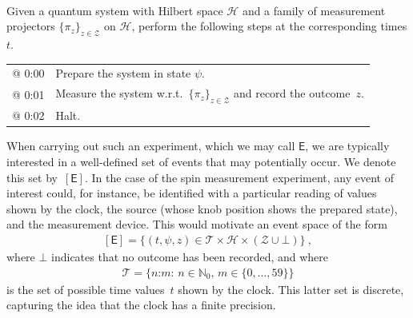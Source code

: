 \documentclass{article}
\theoremstyle{plain}
\theoremstyle{definition}
\newcommand*{\cH}{\mathcal{H}}
\newcommand*{\cT}{\mathcal{T}}
\newcommand*{\cZ}{\mathcal{Z}}
\newcommand*{\Exp}{\mathsf{E}}
\newcommand*{\BME}{\mathbf{BME}}
\newcommand*{\ExpBegin}[1]{
\vspace{0.2ex}
\begin{center}
\begin{minipage}{\linewidth}
\begin{framed}
\vspace{-0.6ex}
{\centering {\bf #1} \\ }
\vspace{1.1ex}
\nobreak}
\newcommand*{\ExpEnd}{
\vspace{-0.8ex}
\end{framed}
\end{minipage}
\end{center}
}
\begin{document}
\ExpBegin{Basic Measurement Experiment ($\BME$) }
  \noindent Given a quantum system with Hilbert space $\cH$ and a family of measurement projectors $\{\pi_z\}_{z \in \cZ}$ on $\cH$, perform the following steps at the corresponding times $t$.\footnotemark
 \vspace{1.4ex}

 \hspace{-0.6em}
\begin{tabular}{p{2.9em} p{}}
  @ 0:00 & Prepare the system in state $\psi$. \\
  @ 0:01 & Measure the system w.r.t.\  $\{\pi_z\}_{z \in \cZ}$ and record the outcome~$z$. \\
  @ 0:02 & Halt. 
\end{tabular}
\ExpEnd



When carrying out such an experiment, which we may call $\Exp$, we are typically interested in a well-defined set of events that may potentially occur. We denote this set by~$[\Exp]$. In the case of the spin measurement experiment, any  event of interest could, for instance, be identified with a particular reading of values shown by the clock, the source (whose knob position shows the prepared state), and the measurement device. This would motivate an event space of the form
\begin{align} \label{eq_BMEevents}
  [\Exp] = \bigl\{ (t, \psi, z) \in \cT \times \cH \times (\cZ \cup {\bot}) 
   \bigr\} \ ,
\end{align}
where  $\bot$ indicates that no outcome has been recorded, and where
\begin{align} \label{eq_timeset}
  \cT = \bigl\{\text{$n$:$m$}: \, n \in \mathbb{N}_0, \, m \in \{0, \ldots, 59\} \bigr\} 
\end{align}
is the set of possible time values~$t$ shown by the clock. This latter set is discrete, capturing the idea that the clock has a finite precision. 
\end{document}
